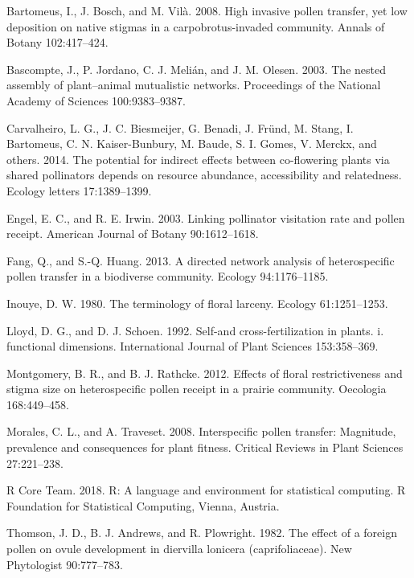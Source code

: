 \documentclass[11pt,a4paper]{article}
\begin{document}
\hypertarget{ref-bartomeus2008}{}
Bartomeus, I., J. Bosch, and M. Vilà. 2008. High invasive pollen
transfer, yet low deposition on native stigmas in a carpobrotus-invaded
community. Annals of Botany 102:417--424.

\hypertarget{ref-bascompte2003}{}
Bascompte, J., P. Jordano, C. J. Melián, and J. M. Olesen. 2003. The
nested assembly of plant--animal mutualistic networks. Proceedings of
the National Academy of Sciences 100:9383--9387.

\hypertarget{ref-carvalheiro2014}{}
Carvalheiro, L. G., J. C. Biesmeijer, G. Benadi, J. Fründ, M. Stang, I.
Bartomeus, C. N. Kaiser-Bunbury, M. Baude, S. I. Gomes, V. Merckx, and
others. 2014. The potential for indirect effects between co-flowering
plants via shared pollinators depends on resource abundance,
accessibility and relatedness. Ecology letters 17:1389--1399.

\hypertarget{ref-engel2003}{}
Engel, E. C., and R. E. Irwin. 2003. Linking pollinator visitation rate
and pollen receipt. American Journal of Botany 90:1612--1618.

\hypertarget{ref-fang2013}{}
Fang, Q., and S.-Q. Huang. 2013. A directed network analysis of
heterospecific pollen transfer in a biodiverse community. Ecology
94:1176--1185.

\hypertarget{ref-inouye1980}{}
Inouye, D. W. 1980. The terminology of floral larceny. Ecology
61:1251--1253.

\hypertarget{ref-lloyd1992}{}
Lloyd, D. G., and D. J. Schoen. 1992. Self-and cross-fertilization in
plants. i. functional dimensions. International Journal of Plant
Sciences 153:358--369.

\hypertarget{ref-montgomery2012}{}
Montgomery, B. R., and B. J. Rathcke. 2012. Effects of floral
restrictiveness and stigma size on heterospecific pollen receipt in a
prairie community. Oecologia 168:449--458.

\hypertarget{ref-morales2008}{}
Morales, C. L., and A. Traveset. 2008. Interspecific pollen transfer:
Magnitude, prevalence and consequences for plant fitness. Critical
Reviews in Plant Sciences 27:221--238.

\hypertarget{ref-R_Core_Team_2018}{}
R Core Team. 2018. R: A language and environment for statistical
computing. R Foundation for Statistical Computing, Vienna, Austria.

\hypertarget{ref-thomson1982}{}
Thomson, J. D., B. J. Andrews, and R. Plowright. 1982. The effect of a
foreign pollen on ovule development in diervilla lonicera
(caprifoliaceae). New Phytologist 90:777--783.
\end{document}
